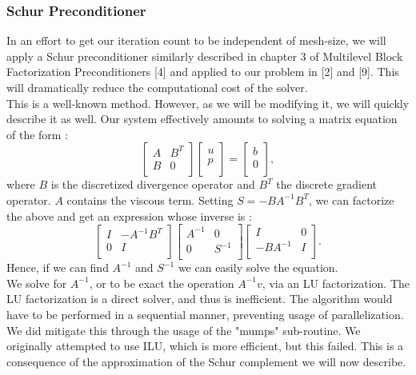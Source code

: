 \documentclass[11pt,twoside,a4paper]{article}
\begin{document}
\subsubsection{Schur Preconditioner}
In an effort to get our iteration count to be independent of mesh-size, we will apply a Schur preconditioner similarly described in chapter 3 of Multilevel Block Factorization Preconditioners [4] and applied to our problem in [2] and [9]. This will dramatically reduce the computational cost of the solver.\\
This is a well-known method. However, as we will be modifying it, we will quickly describe it as well.
Our system effectively amounts to solving a matrix equation of the form :
$$
\begin{bmatrix}
A         & B^{T}\\
B         & 0 \\
\end{bmatrix}
\begin{bmatrix}
u    \\
p     \\
\end{bmatrix}
=
\begin{bmatrix}
b    \\
0     \\
\end{bmatrix} ,
$$
where $B$ is the discretized divergence operator and $B^T$ the discrete gradient operator. $A$ contains the viscous term.
Setting $S = - B A^{-1} B^{T}$, we can factorize the above and get an expression whose inverse is :
$$
\begin{bmatrix}
I         & - A^{-1} B^{T}\\
0         & I \\
\end{bmatrix}
\begin{bmatrix}
A^{-1}   & 0\\
0       & S^{-1} \\
\end{bmatrix}
\begin{bmatrix}
I & 0\\
 - B A^{-1}       & I \\
\end{bmatrix} .
$$
Hence, if we can find $A^{-1}$ and $S^{-1}$ we can easily solve the equation.\\
We solve for $A^{-1}$, or to be exact the operation $A^{-1}v$, via an LU factorization. The LU factorization is a direct solver, and thus is inefficient. The algorithm would have to be performed in a sequential manner, preventing usage of parallelization. We did mitigate this through the usage of the "mumps" sub-routine. We originally attempted to use ILU, which is more efficient, but this failed. This is a consequence of the approximation of the Schur complement we will now describe.\\
\end{document}
